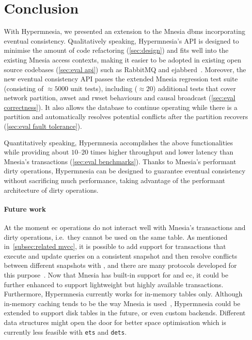 \section{Conclusion} \label{sec:concl}


With Hypermnesia, we presented an extension to the Mnesia \acrshort{dbms}
incorporating eventual consistency. 
Qualitatively speaking, Hypermnesia's API is designed to minimise the amount of 
code refactoring (\cref{sec:design}) and fits well into the existing Mnesia 
access contexts, making it easier to be adopted in existing open source codebases
(\cref{sec:eval api}) such as RabbitMQ and 
ejabberd~\cite{vmware2023rabbitmq,processone2023ejabberd}.
Moreover, the new eventual consistency API passes the extended Mnesia regression 
test suite (consisting of \(\approx 5000\) unit tests), including (\(\approx 20\)) 
additional tests that cover network partition, \acrshort{awset} and \acrshort{rwset} 
behaviours and causal broadcast (\cref{sec:eval correctness}). It also allows the database to 
continue operating while there is a partition and automatically resolves potential 
conflicts after the partition recovers (\cref{sec:eval fault tolerance}).

Quantitatively speaking, Hypermnesia accomplishes the above functionalities
while providing about \(10\)--\(20\) times higher throughput and 
lower latency than Mnesia's transactions (\cref{sec:eval benchmarks}). Thanks to Mnesia's
performant dirty operations, Hypermnesia can be designed to guarantee eventual 
consistency without sacrificing much performance, taking advantage of the
performant architecture of dirty operations.


\paragraph{Future work}
  At the moment \acrshort{ec} operations do not interact well with Mnesia's
  transactions and dirty operations, i.e.\ they cannot be used on the same table.
  As mentioned in~\cref{subsec:related mvcc}, it is possible to add support for
  transactions that execute and update queries on a
  consistent snapshot and then resolve conflicts between different snapshots
  with , and there are many protocols developed for this 
  purpose~\cite{preguica2014SwiftCloud,shapiro2018Antidote}.
  Now that Mnesia has built-in support for  and \acrlong{ec},
  it could be further enhanced to support lightweight but highly available
  transactions. 
  Furthermore, Hypermnesia currently works for in-memory tables only. Although in-memory 
  caching tends to be the way Mnesia is used~\cite{mattsson1998mnesia},
  Hypermnesia could be extended to support disk tables in the future, or even 
  custom backends. Different data structures might open the door 
  for better space optimisation which is currently less feasible 
  with \texttt{ets} and \texttt{dets}.


